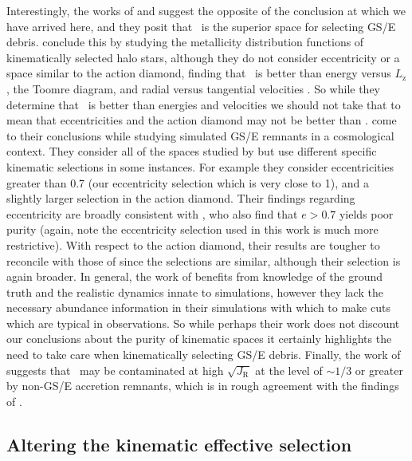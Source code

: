 Interestingly, the works of \textcite{feuillet20} and \parencite{carrillo23} suggest the opposite of the conclusion at which we have arrived here, and they posit that \JRLz\ is the superior space for selecting GS/E debris. \textcite{feuillet20} conclude this by studying the metallicity distribution functions of kinematically selected halo stars, although they do not consider eccentricity or a space similar to the action diamond, finding that \JRLz\ is better than energy versus $L_\mathrm{z}$, the Toomre diagram, and radial versus tangential velocities \parencite[this is actually consistent with the conclusions of ][]{lane22}. So while they determine that \JRLz\ is better than energies and velocities we should not take that to mean that eccentricities and the action diamond may not be better than \JRLz. \textcite{carrillo23} come to their conclusions while studying simulated GS/E remnants in a cosmological context. They consider all of the spaces studied by \cite{lane22} but use different specific kinematic selections in some instances. For example they consider eccentricities greater than 0.7 (our eccentricity selection which is very close to 1), and a slightly larger selection in the action diamond. Their findings regarding eccentricity are broadly consistent with \cite{lane22}, who also find that $e > 0.7$ yields poor purity (again, note the eccentricity selection used in this work is much more restrictive). With respect to the action diamond, their results are tougher to reconcile with those of \cite{lane22} since the selections are similar, although their selection is again broader. In general, the work of \textcite{carrillo23} benefits from knowledge of the ground truth and the realistic dynamics innate to simulations, however they lack the necessary abundance information in their simulations with which to make cuts which are typical in observations. So while perhaps their work does not discount our conclusions about the purity of kinematic spaces it certainly highlights the need to take care when kinematically selecting GS/E debris. Finally, the work of \textcite{donlon23} suggests that \JRLz\ may be contaminated at high $\sqrt{J_\mathrm{R}}$ at the level of $\sim 1/3$ or greater by non-GS/E accretion remnants, which is in rough agreement with the findings of \cite{lane22}.

\subsection{Altering the kinematic effective selection}
\label{ch3:subsec:altering-kinematic-effective-selection-function}

